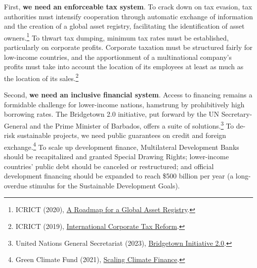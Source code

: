 \documentclass[a5paper,english,openany]{memoir}
\begin{document}
First, \textbf{we need an enforceable tax system}. To crack down on tax evasion, tax authorities must intensify cooperation through automatic exchange of information and the creation of a global asset registry, facilitating the identification of asset owners.\footnote{ICRICT (2020), \href{https://static1.squarespace.com/static/5a0c602bf43b5594845abb81/t/5c988368eef1a1538c2ae7eb/1553498989927/GAR.pdf}{A Roadmap for a Global Asset Registry}.} 
To thwart tax dumping, minimum tax rates must be established, particularly on corporate profits. Corporate taxation must be structured fairly for low-income countries, and the apportionment of a multinational company's profits must take into account the location of its employees at least as much as the location of its sales.\footnote{ICRICT (2019), \href{https://static1.squarespace.com/static/5a0c602bf43b5594845abb81/t/5d979e6dc5f7cb7b66842c49/1570217588721/ICRICT-INTERNATIONAL+CORPORATE+TAX+REFORM.pdf}{International Corporate Tax Reform}.}%

Second, \textbf{we need an inclusive financial system}. Access to financing remains a formidable challenge for lower-income nations, hamstrung by prohibitively high borrowing rates. The Bridgetown 2.0 initiative, put forward by the UN Secretary-General and the Prime Minister of Barbados, offers a suite of solutions.\footnote{United Nations General Secretariat (2023), \href{https://www.un.org/sustainabledevelopment/blog/2023/04/press-release-with-clock-ticking-for-the-sdgs-un-chief-and-barbados-prime-minister-call-for-urgent-action-to-transform-broken-global-financial-system/}{Bridgetown Initiative 2.0}.} %
To de-risk sustainable projects, we need public guarantees on credit and foreign exchange.\footnote{Green Climate Fund (2021), \href{https://www.greenclimate.fund/sites/default/files/document/scaling-climate-finance-context-covid-19-full-report\_0.pdf}{Scaling Climate Finance}.} 
To scale up development finance, Multilateral Development Banks should be recapitalized %
and granted Special Drawing Rights; lower-income countries' public debt should be canceled %
or restructured; and official development financing should be expanded to reach \$500 billion per year (a long-overdue stimulus for the Sustainable Development Goals). %
\end{document}
